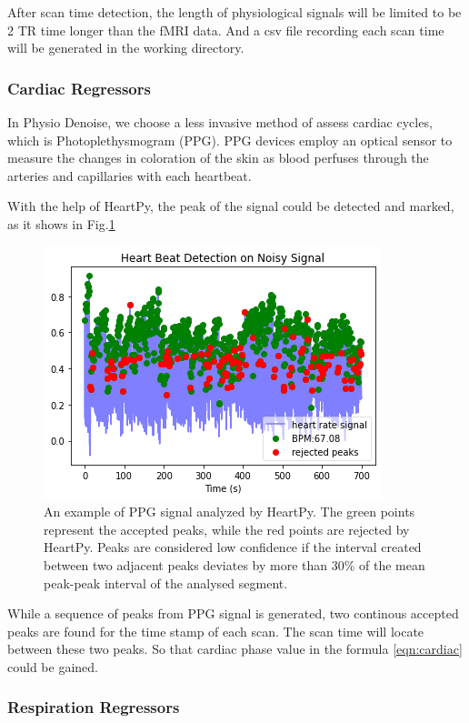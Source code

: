 After scan time detection, the length of physiological signals will be limited to be 2 TR time longer than the 
fMRI data. And a csv file recording each scan time will be generated in the working directory.

\subsubsection{Cardiac Regressors}

In Physio Denoise, we choose a less invasive method of assess cardiac cycles, which is Photoplethysmogram (PPG). 
PPG devices employ an optical sensor to measure the changes in coloration of the skin as blood perfuses through the arteries and capillaries with each heartbeat.\cite{van2019heartpy}

With the help of HeartPy, the peak of the signal could be detected and marked, as it shows in Fig.\ref{fig:heart}

\begin{figure}[htp]
    \centering
    \includegraphics[width=\columnwidth]{Figures/heartpy.png}
    \caption{An example of PPG signal analyzed by HeartPy. The green points represent the accepted peaks,
    while the red points are rejected by HeartPy. Peaks are considered low confidence if the interval created between two adjacent peaks deviates 
    by more than 30\% of the mean peak-peak interval of the analysed segment.\cite{van2019heartpy}}
    \label{fig:heart}
\end{figure} 

While a sequence of peaks from PPG signal is generated, two continous accepted peaks are found for the time stamp of each scan.
The scan time will locate between these two peaks. So that cardiac phase value in the formula \ref{eqn:cardiac} could be gained.

\subsubsection{Respiration Regressors}

